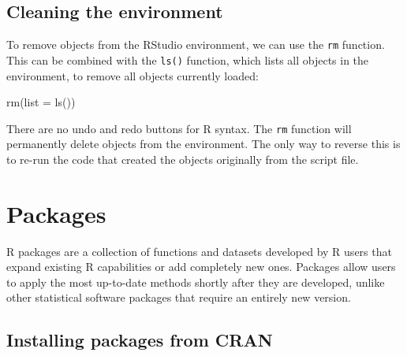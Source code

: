 \documentclass[
  letterpaper,
  DIV=11,
  numbers=noendperiod]{scrreprt}
\newenvironment{Shaded}{\begin{snugshade}}{\end{snugshade}}
\newcommand{\AttributeTok}[1]{\textcolor[rgb]{0.40,0.45,0.13}{#1}}
\newcommand{\FunctionTok}[1]{\textcolor[rgb]{0.28,0.35,0.67}{#1}}
\newcommand{\NormalTok}[1]{\textcolor[rgb]{0.00,0.23,0.31}{#1}}
\begin{document}
\subsection{Cleaning the environment}\label{cleaning-the-environment}

To remove objects from the RStudio environment, we can use the
\texttt{rm} function. This can be combined with the \texttt{ls()}
function, which lists all objects in the environment, to remove all
objects currently loaded:

\begin{Shaded}
\begin{Highlighting}[]
\FunctionTok{rm}\NormalTok{(}\AttributeTok{list =} \FunctionTok{ls}\NormalTok{())}
\end{Highlighting}
\end{Shaded}

\begin{tcolorbox}[enhanced jigsaw, bottomrule=.15mm, left=2mm, leftrule=.75mm, bottomtitle=1mm, coltitle=black, colbacktitle=quarto-callout-warning-color!10!white, toptitle=1mm, arc=.35mm, breakable, title=\textcolor{quarto-callout-warning-color}{\faExclamationTriangle}\hspace{0.5em}{Warning}, rightrule=.15mm, toprule=.15mm, opacityback=0, opacitybacktitle=0.6, titlerule=0mm, colback=white, colframe=quarto-callout-warning-color-frame]

There are no undo and redo buttons for R syntax. The \texttt{rm}
function will permanently delete objects from the environment. The only
way to reverse this is to re-run the code that created the objects
originally from the script file.

\end{tcolorbox}

\section{Packages}\label{packages}

R packages are a collection of functions and datasets developed by R
users that expand existing R capabilities or add completely new ones.
Packages allow users to apply the most up-to-date methods shortly after
they are developed, unlike other statistical software packages that
require an entirely new version.

\subsection{Installing packages from
CRAN}\label{installing-packages-from-cran}
\end{document}
